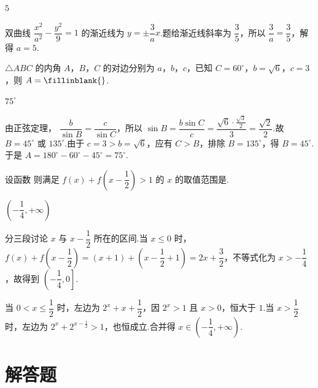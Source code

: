 \begin{answer}
\(5\)
\end{answer}

\begin{solution}
双曲线 \(\dfrac{x^2}{a^2}-\dfrac{y^2}{9}=1\) 的渐近线为 \(y=\pm\dfrac3a x\).题给渐近线斜率为 \(\dfrac35\)，所以 \(\dfrac3a=\dfrac35\)，解得 \(a=5\).
\end{solution}

\begin{problem}
\(\triangle ABC\) 的内角 \(A\)，\(B\)，\(C\) 的对边分别为 \(a\)，\(b\)，\(c\)，已知 \(C=60^\circ\)，\(b=\sqrt6\)，\(c=3\)，则 \(A=\fillinblank{}\).
\end{problem}

\begin{answer}
\(75^\circ\)
\end{answer}

\begin{solution}
由正弦定理，
\(\dfrac{b}{\sin B}=\dfrac{c}{\sin C}\)，所以
\(\sin B=\dfrac{b\sin C}{c}=\dfrac{\sqrt6\cdot\frac{\sqrt3}{2}}{3}=\dfrac{\sqrt2}{2}\).故 \(B=45^\circ\) 或 \(135^\circ\).由于 \(c=3>b=\sqrt6\)，应有 \(C>B\)，排除 \(B=135^\circ\)，得 \(B=45^\circ\).于是 \(A=180^\circ-60^\circ-45^\circ=75^\circ\).
\end{solution}

\begin{problem}
设函数
则满足 \(f(x)+f\left(x-\dfrac12\right)>1\) 的 \(x\) 的取值范围是\fillinblank{}.
\end{problem}

\begin{answer}
\(\left(-\dfrac14,+\infty\right)\)
\end{answer}

\begin{solution}
分三段讨论 \(x\) 与 \(x-\dfrac12\) 所在的区间.当 \(x\leq0\) 时，
\(f(x)+f\left(x-\dfrac12\right)=(x+1)+\left(x-\dfrac12+1\right)=2x+\dfrac32\)，不等式化为 \(x>-\dfrac14\)，故得到 \(\left(-\dfrac14,0\right]\).

当 \(0<x\leq\dfrac12\) 时，左边为 \(2^x+x+\dfrac12\)，因 \(2^x>1\) 且 \(x>0\)，恒大于 \(1\).当 \(x>\dfrac12\) 时，左边为 \(2^x+2^{x-\frac12}>1\)，也恒成立.合并得 \(x\in\left(-\dfrac14,+\infty\right)\).
\end{solution}

\section{解答题}

